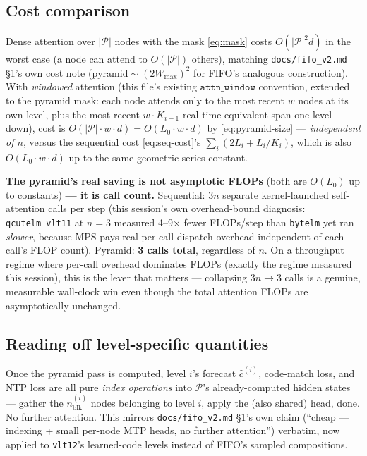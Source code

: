 \documentclass[11pt]{article}
\begin{document}
\subsection{Cost comparison}
\label{sec:cost}

Dense attention over $|\mathcal{P}|$ nodes with the mask
\eqref{eq:mask} costs $O(|\mathcal{P}|^2 d)$ in the worst case (a node
can attend to $O(|\mathcal{P}|)$ others), matching
\texttt{docs/fifo\_v2.md} \S1's own cost note
($\mathrm{pyramid} \sim (2 W_{\max})^2$ for FIFO's analogous
construction). With \emph{windowed} attention (this file's existing
$\texttt{attn\_window}$ convention, extended to the pyramid mask: each
node attends only to the most recent $w$ nodes at its own level, plus
the most recent $w \cdot K_{i-1}$ real-time-equivalent span one level
down), cost is $O(|\mathcal{P}| \cdot w \cdot d) = O(L_0 \cdot w \cdot d)$
by \eqref{eq:pyramid-size} — \emph{independent of $n$}, versus the
sequential cost \eqref{eq:seq-cost}'s $\sum_i (2L_i + L_i/K_i)$, which is
also $O(L_0 \cdot w \cdot d)$ up to the same geometric-series constant.

\textbf{The pyramid's real saving is not asymptotic FLOPs} (both are
$O(L_0)$ up to constants) \textbf{— it is call count.} Sequential:
$3n$ separate kernel-launched self-attention calls per step (this
session's own overhead-bound diagnosis: \texttt{qcutelm\_vlt11} at
$n=3$ measured 4--9$\times$ fewer FLOPs/step than \texttt{bytelm} yet ran
\emph{slower}, because MPS pays real per-call dispatch overhead
independent of each call's FLOP count). Pyramid: \textbf{3 calls total},
regardless of $n$. On a throughput regime where per-call overhead
dominates FLOPs (exactly the regime measured this session), this is the
lever that matters — collapsing $3n \to 3$ calls is a genuine,
measurable wall-clock win even though the total attention FLOPs are
asymptotically unchanged.

\subsection{Reading off level-specific quantities}

Once the pyramid pass is computed, level $i$'s forecast
$\hat c^{(i)}$, code-match loss, and NTP loss are all pure \emph{index
operations} into $\mathcal{P}$'s already-computed hidden states —
gather the $n^{(i)}_{\text{blk}}$ nodes belonging to level $i$, apply
the (also shared) head, done. No further attention. This mirrors
\texttt{docs/fifo\_v2.md} \S1's own claim (``cheap — indexing + small
per-node MTP heads, no further attention'') verbatim, now applied to
\texttt{vlt12}'s learned-code levels instead of FIFO's sampled
compositions.
\end{document}
